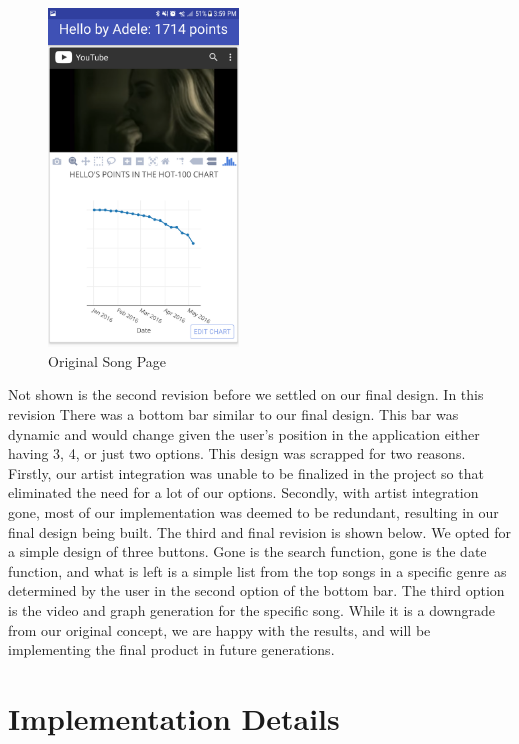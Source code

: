 \documentclass{article}
\newcommand\tab[1][1cm]{\hspace*{#1}}
\begin{document}
\begin{figure}[H]
  \begin{center}
    \includegraphics[width=0.45\textwidth]{original_song_graph.png}
    \caption{Original Song Page}
    \label{fig:ER}
  \end{center}
\end{figure}
\tab Not shown is the second revision before we settled on our final design. In this revision There was a bottom bar similar to our final design. This bar was dynamic and would change given the user's position in the application either having 3, 4, or just two options. This design was scrapped for two reasons. Firstly, our artist integration was unable to be finalized in the project so that eliminated the need for a lot of our options. Secondly, with artist integration gone, most of our implementation was deemed to be redundant, resulting in our final design being built. 
\tab The third and final revision is shown below. We opted for a simple design of three buttons. Gone is the search function, gone is the date function, and what is left is a simple list from the top songs in a specific genre as determined by the user in the second option of the bottom bar. The third option is the video and graph generation for the specific song. While it is a downgrade from our original concept, we are happy with the results, and will be implementing the final product in future generations. 


\section*{Implementation Details}
\end{document}
